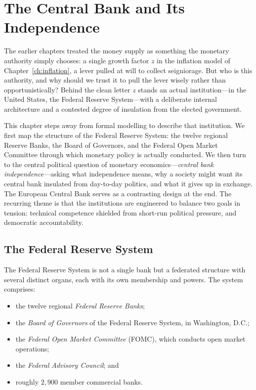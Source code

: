 \chapter{The Central Bank and Its Independence}
\label{ch:central-bank}

The earlier chapters treated the money supply as something the monetary authority simply chooses: a single growth factor $z$ in the inflation model of Chapter~\ref{ch:inflation}, a lever pulled at will to collect seigniorage. But who is this authority, and why should we trust it to pull the lever wisely rather than opportunistically? Behind the clean letter $z$ stands an actual institution---in the United States, the Federal Reserve System---with a deliberate internal architecture and a contested degree of insulation from the elected government.

This chapter steps away from formal modelling to describe that institution. We first map the structure of the Federal Reserve System: the twelve regional Reserve Banks, the Board of Governors, and the Federal Open Market Committee through which monetary policy is actually conducted. We then turn to the central political question of monetary economics---\emph{central bank independence}---asking what independence means, why a society might want its central bank insulated from day-to-day politics, and what it gives up in exchange. The European Central Bank serves as a contrasting design at the end. The recurring theme is that the institutions are engineered to balance two goals in tension: technical competence shielded from short-run political pressure, and democratic accountability.

\section{The Federal Reserve System}

The Federal Reserve System is not a single bank but a federated structure with several distinct organs, each with its own membership and powers. The system comprises:

\begin{itemize}
    \item the twelve regional \emph{Federal Reserve Banks};
    \item the \emph{Board of Governors} of the Federal Reserve System, in Washington, D.C.;
    \item the \emph{Federal Open Market Committee} (FOMC), which conducts open market operations;
    \item the \emph{Federal Advisory Council}; and
    \item roughly $2{,}900$ member commercial banks.
\end{itemize}


